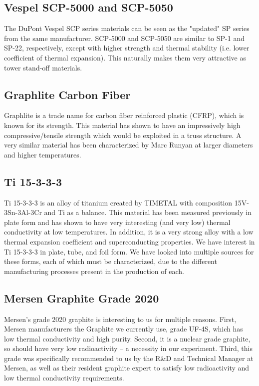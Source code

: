 \documentclass{report}
\begin{document}
\subsection{Vespel SCP-5000 and SCP-5050}
The DuPont Vespel SCP series materials can be seen as the "updated" SP series from the same manufacturer. SCP-5000 and SCP-5050 are similar to SP-1 and SP-22, respectively, except with higher strength and thermal stability (i.e. lower coefficient of thermal expansion). This naturally makes them very attractive as tower stand-off materials.

\subsection{Graphlite Carbon Fiber}
Graphlite is a trade name for carbon fiber reinforced plastic (CFRP), which is known for its strength. This material has shown to have an impressively high compressive/tensile strength which would be exploited in a truss structure. A very similar material has been characterized by Marc Runyan at larger diameters and higher temperatures.

\subsection{Ti 15-3-3-3}
Ti 15-3-3-3 is an alloy of titanium created by TIMETAL with composition 15V-3Sn-3Al-3Cr and Ti as a balance. This material has been measured previously in plate form and has shown to have very interesting (and very low) thermal conductivity at low temperatures. In addition, it is a very strong alloy with a low thermal expansion coefficient and superconducting properties. We have interest in Ti 15-3-3-3 in plate, tube, and foil form. We have looked into multiple sources for these forms, each of which must be characterized, due to the different manufacturing processes present in the production of each.

\subsection{Mersen Graphite Grade 2020}
Mersen's grade 2020 graphite is interesting to us for multiple reasons. First, Mersen manufacturers the Graphite we currently use, grade UF-4S, which has low thermal conductivity and high purity. Second, it is a nuclear grade graphite, so should have very low radioactivity -- a necessity in our experiment. Third, this grade was specifically recommended to us by the R\&D and Technical Manager at Mersen, as well as their resident graphite expert to satisfy low radioactivity and low thermal conductivity requirements.
\end{document}
